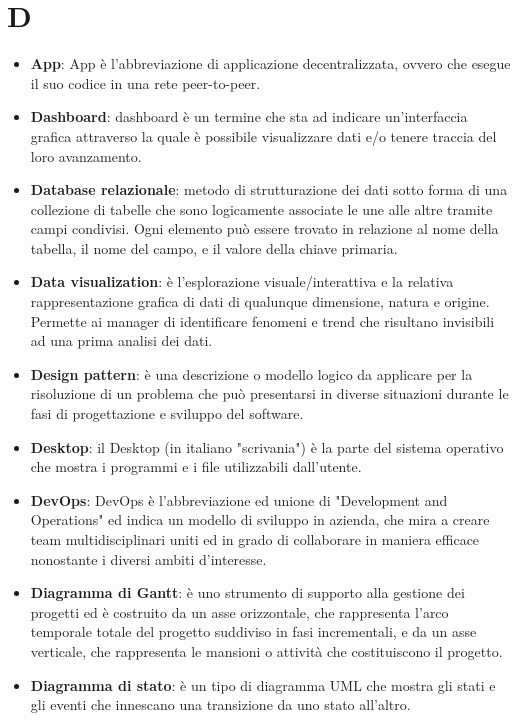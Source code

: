 \documentclass[a4paper, oneside, openany, dvipsnames, table]{article}
\begin{document}
\section{D}
\begin{itemize}
\item \textbf{\DJ App}: \DJ App è l'abbreviazione di applicazione decentralizzata, ovvero che esegue il suo codice in una rete peer-to-peer.
\item \textbf{Dashboard}: dashboard è un termine che sta ad indicare un'interfaccia grafica attraverso la quale è possibile visualizzare dati e/o tenere traccia del loro avanzamento.
\item \textbf{Database relazionale}: metodo di strutturazione dei dati sotto forma di una collezione di tabelle che sono logicamente associate le une alle altre tramite campi condivisi. Ogni elemento può essere trovato in relazione al nome della tabella, il nome del campo, e il valore della chiave primaria.
\item \textbf{Data visualization}: è l'esplorazione visuale/interattiva e la relativa rappresentazione grafica di dati di qualunque dimensione, natura e origine. Permette ai manager di identificare fenomeni e trend che risultano invisibili ad una prima analisi dei dati.
\item \textbf{Design pattern}: è una descrizione o modello logico da applicare per la risoluzione di un problema che può presentarsi in diverse situazioni durante le fasi di progettazione e sviluppo del software.
\item \textbf{Desktop}: il Desktop (in italiano "scrivania") è la parte del sistema operativo che mostra i programmi e i file utilizzabili dall'utente.
\item \textbf{DevOps}: DevOps è l'abbreviazione ed unione di "Development and Operations" ed indica un modello di sviluppo in azienda, che mira a creare team multidisciplinari uniti ed in grado di collaborare in maniera efficace nonostante i diversi ambiti d'interesse.
\item \textbf{Diagramma di Gantt}: è uno strumento di supporto alla gestione dei progetti ed è costruito da un asse orizzontale, che rappresenta l'arco temporale totale del progetto suddiviso in fasi incrementali, e da un asse verticale, che rappresenta le mansioni o attività che costituiscono il progetto.
\item \textbf{Diagramma di stato}: è un tipo di diagramma UML che mostra gli stati e gli eventi che innescano una transizione da uno stato all'altro.
\end{itemize}
\end{document}
